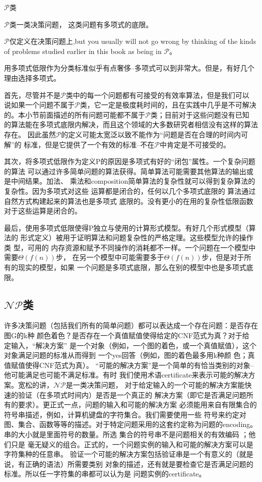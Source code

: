 \begin{definition}
$\mathcal{P}$类

$\mathcal{P}$类一类决策问题， 这类问题有多项式的底限。
\end{definition}

$\mathcal{P}$仅定义在决策问题上,but you usually will not go wrong by thinking of
the kinds of problems studied earlier in this book as being in $\mathcal{P}$。

用多项式低限作为分类标准似乎有点奢侈--多项式可以到非常大。但是，有好几个
理由选择多项式。

首先，尽管并不是$\mathcal{P}$类中的每一个问题都有可接受的有效率算法，但是我们可以
说如果一个问题不属于$\mathcal{P}$类，它一定是极度耗时间的，且在实践中几乎是不可解决
的。本小节前面描述的所有问题可能都不属于$\mathcal{P}$类；目前对于这些问题没有已知
的算法能在多项式底限内解决，而且这个领域的大多数研究者相信没有这样的算法存在。
因此虽然$\mathcal{P}$的定义可能太宽泛以致不能作为“问题是否在合理的时间内可解”的
标准，但是它提供了一个有效的标准--不在$\mathcal{P}$中肯定是不可接受的。

其次，将多项式低限作为定义P的原因是多项式有好的“闭包”属性。一个复杂问题的算法
可以通过许多简单问题的算法获得。简单算法可能需要其他算法的输出或是中间结果。加法、
乘法和composition简单算法的复杂性就可以得到复杂算法的复杂性。因为多项式对这些
运算都是闭合的，任何以几个多项式底限的 算法通过自然方式构建起来的算法也是多项式
底限的。没有更小的在用的复杂性低限函数对于这些运算是闭合的。

最后，使用多项式低限使得P独立与使用的计算形式模型。有好几个形式模型（算法的
形式定义）被用于证明算法和问题复杂性的严格定理。这些模型允许的操作类 型，可用的
内存资源和赋予不同操作的消耗都不一样。一个问题在一个模型中需要$\Theta(f(n))$步，
在另一个模型中可能需要多于$\Theta(f(n))$步，但是对于所有的现实的模型，如果
一个问题是多项式底限，那么在别的模型中也是多项式底限。

\subsection{$\mathcal {NP}$类}
许多决策问题（包括我们所有的简单问题）都可以表达成一个存在问题：是否存在图G的k种
颜色着色？是否存在一个真值赋值使得给定的CNF范式为真？对于给 定输入，“解决方案”
是一个对象（例如，一个图的着色，或一个真值赋值），这个对象满足问题的标准从而得到
一个yes回答（例如，图的着色最多用k种颜 色；真值赋值使得CNF范式为真）。
“可能的解决方案”是一个简单的有恰当类别的对象--他可能满足也可能不满足标准。有时
我们使用术语certificate来表示可能的解决方案。宽松的讲，$\mathcal{NP}$是一类决策问题，
对于给定输入的一个可能的解决方案能快速的验证（在多项式时间内）是否是一个真正的
解决方案（即它是否满足问题所有的要求）。更正式一点，问题的输入和可能的解决方案
必须能用来自有限集合的符号串描述，例如，计算机键盘的字符集合。我们需要使用一些
符号来约定对图、集合、函数等等的描述。对于特定问题采用的这套约定称为问题的encoding。
串的大小就是里面符号的数量。所选 集合的符号串不是问题相关的有效编码 ；他们只是
毫无疑义的组合。正式的，一个问题实例的输入和可能的解决方案可以是字符集种的任意串。
验证一个可能的解决方案包括验证串是一个有意义的（就是说，有正确的语法）所需要类别
对象的描述，还有就是要检查它是否满足问题的标准。所以任一字符集的串都可以认为是
问题实例的certificate。

